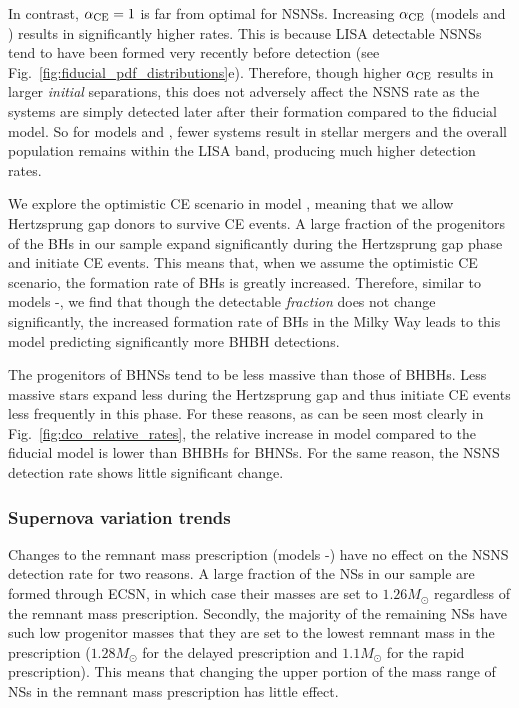 In contrast, $\alpha_{\rm CE} = 1$ is far from optimal for NSNSs. Increasing $\alpha_{\rm CE}$ (models \modAlphaHigh{} and \modAlphaHighest{}) results in significantly higher rates. This is because LISA detectable NSNSs tend to have been formed very recently before detection (see Fig.~\ref{fig:fiducial_pdf_distributions}e). Therefore, though higher $\alpha_{\rm CE}$ results in larger \textit{initial} separations, this does not adversely affect the NSNS rate as the systems are simply detected later after their formation compared to the fiducial model. So for models \modAlphaHigh{} and \modAlphaHighest{}, fewer systems result in stellar mergers and the overall population remains within the LISA band, producing much higher detection rates. %

We explore the optimistic CE scenario in model \modOpt{}, meaning that we allow Hertzsprung gap donors to survive CE events. A large fraction of the progenitors of the BHs in our sample expand significantly during the Hertzsprung gap phase and initiate CE events. This means that, when we assume the optimistic CE scenario, the formation rate of BHs is greatly increased. Therefore, similar to models \modAlphaLowest{}-\modAlphaHighest{}, we find that though the detectable \textit{fraction} does not change significantly, the increased formation rate of BHs in the Milky Way leads to this model predicting significantly more BHBH detections.

The progenitors of BHNSs tend to be less massive than those of BHBHs. Less massive stars expand less during the Hertzsprung gap and thus initiate CE events less frequently in this phase. For these reasons, as can be seen most clearly in Fig.~\ref{fig:dco_relative_rates}, the relative increase in model \modOpt{} compared to the fiducial model is lower than BHBHs for BHNSs. For the same reason, the NSNS detection rate shows little significant change.

\subsubsection{Supernova variation trends}

Changes to the remnant mass prescription (models \modRapid{}-\modNSHigh{}) have no effect on the NSNS detection rate for two reasons. A large fraction of the NSs in our sample are formed through ECSN, in which case their masses are set to $1.26 \unit{M_\odot}$ regardless of the remnant mass prescription. Secondly, the majority of the remaining NSs have such low progenitor masses that they are set to the lowest remnant mass in the prescription ($1.28 \unit{M_\odot}$ for the delayed prescription and $1.1 \unit{M_\odot}$ for the rapid prescription). This means that changing the upper portion of the mass range of NSs in the remnant mass prescription has little effect.

